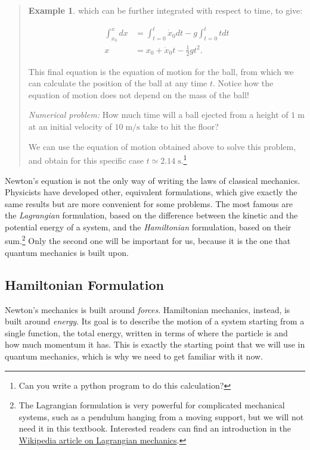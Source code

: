 \documentclass[
  english,
  9pt,
]{extbook}
\theoremstyle{definition}
\theoremstyle{definition}
\newtheorem{example}{Example}[chapter]
\theoremstyle{definition}
\theoremstyle{definition}
\theoremstyle{remark}
\begin{document}
\begin{quote}
\begin{example}
which can be further integrated with respect to time, to give:

\begin{equation}
\begin{aligned}
\int_{x_0}^{x} dx &= \int_{t=0}^{t} \dot{x}_0 dt -g \int_{t=0}^{t}tdt\\
x &= x_0 + \dot{x}_0 t -\frac{1}{2}gt^2.
\end{aligned}
\end{equation}

This final equation is the equation of motion for the ball, from which we can calculate the position of the ball at any time \(t\). Notice how the equation of motion does not depend on the mass of the ball!

\emph{Numerical problem:} How much time will a ball ejected from a height of \(1 \;\mathrm{m}\) at an initial velocity of \(10 \;\mathrm{m/s}\) take to hit the floor?

We can use the equation of motion obtained above to solve this problem, and obtain for this specific case \(t\simeq2.14\;\mathrm{s}\).\footnote{Can you write a python program to do this calculation?}
\end{example}
\end{quote}

Newton's equation is not the only way of writing the laws of classical mechanics. Physicists have developed other, equivalent formulations, which give exactly the same results but are more convenient for some problems. The most famous are the \emph{Lagrangian} formulation, based on the difference between the kinetic and the potential energy of a system, and the \emph{Hamiltonian} formulation, based on their sum.\footnote{The Lagrangian formulation is very powerful for complicated mechanical systems, such as a pendulum hanging from a moving support, but we will not need it in this textbook. Interested readers can find an introduction in the \href{https://en.wikipedia.org/wiki/Lagrangian_mechanics}{Wikipedia article on Lagrangian mechanics}.} Only the second one will be important for us, because it is the one that quantum mechanics is built upon.

\subsection{Hamiltonian Formulation}\label{hamiltonian-formulation}

Newton's mechanics is built around \emph{forces}. Hamiltonian mechanics, instead, is built around \emph{energy}. Its goal is to describe the motion of a system starting from a single function, the total energy, written in terms of where the particle is and how much momentum it has. This is exactly the starting point that we will use in quantum mechanics, which is why we need to get familiar with it now.
\end{document}
